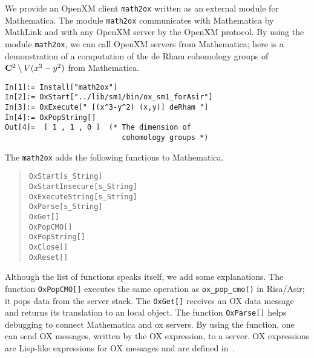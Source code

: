We provide an OpenXM client {\tt math2ox} written as an external module
for Mathematica.  
The module {\tt math2ox} communicates with Mathematica by MathLink and
with any OpenXM server by the OpenXM protocol.  
By using the module {\tt math2ox},
we can call OpenXM servers from Mathematica;
here is a demonstration of a computation of the de Rham cohomology groups
of ${\bf C}^2 \setminus V(x^3-y^2)$ from Mathematica.
{\footnotesize
\begin{verbatim}
In[1]:= Install["math2ox"]
In[2]:= OxStart["../lib/sm1/bin/ox_sm1_forAsir"]
In[3]:= OxExecute[" [(x^3-y^2) (x,y)] deRham "]
In[4]:= OxPopString[]
Out[4]=  [ 1 , 1 , 0 ]  (* The dimension of 
                           cohomology groups *)
\end{verbatim}
}

The {\tt math2ox} adds the following functions to Mathematica.
\begin{quote}
{\tt OxStart[s\_String]} \\
{\tt OxStartInsecure[s\_String]} \\
{\tt OxExecuteString[s\_String]}  \\
{\tt OxParse[s\_String]} \\
{\tt OxGet[]} \\
{\tt OxPopCMO[]} \\
{\tt OxPopString[]} \\
{\tt OxClose[]} \\
{\tt OxReset[]}
\end{quote}
Although the list of functions speaks itself,
we add some explanations.
The function {\tt OxPopCMO[]} executes the same operation
as {\tt ox\_pop\_cmo()} in Risa/Asir;
it pops data from the server stack.
The {\tt OxGet[]} receives an OX data message
and returns its translation to an local object.
The function {\tt OxParse[]} helps debugging to connect Mathematica
and ox servers.
By using the function, one can send OX messages,
written by the OX expression, to a server. 
OX expressions are Lisp-like expressions for OX messages and are defined
in~\cite{noro-takayama}.  
